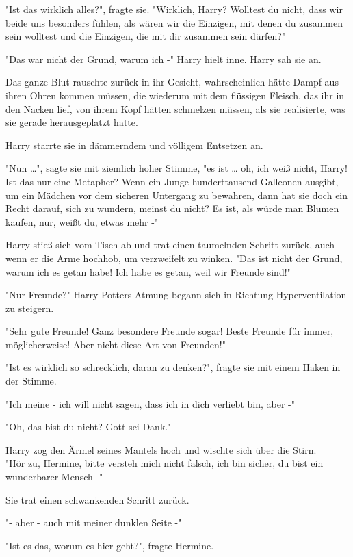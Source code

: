 {"Ist das wirklich alles?", fragte sie. "Wirklich, Harry? Wolltest du nicht, dass wir beide uns besonders fühlen, als wären wir die Einzigen, mit denen du zusammen sein wolltest und die Einzigen, die mit dir zusammen sein dürfen?"

"Das war nicht der Grund, warum ich -" Harry hielt inne. Harry sah sie an.

Das ganze Blut rauschte zurück in ihr Gesicht, wahrscheinlich hätte Dampf aus ihren Ohren kommen müssen, die wiederum mit dem flüssigen Fleisch, das ihr in den Nacken lief, von ihrem Kopf hätten schmelzen müssen, als sie realisierte, was sie gerade herausgeplatzt hatte.

Harry starrte sie in dämmerndem und völligem Entsetzen an.

"Nun …", sagte sie mit ziemlich hoher Stimme, "es ist … oh, ich weiß nicht, Harry! Ist das nur eine Metapher? Wenn ein Junge hunderttausend Galleonen ausgibt, um ein Mädchen vor dem sicheren Untergang zu bewahren, dann hat sie doch ein Recht darauf, sich zu wundern, meinst du nicht? Es ist, als würde man Blumen kaufen, nur, weißt du, etwas mehr -"

Harry stieß sich vom Tisch ab und trat einen taumelnden Schritt zurück, auch wenn er die Arme hochhob, um verzweifelt zu winken. "Das ist nicht der Grund, warum ich es getan habe! Ich habe es getan, weil wir Freunde sind!"

"Nur Freunde?" Harry Potters Atmung begann sich in Richtung Hyperventilation zu steigern.

"Sehr gute Freunde! Ganz besondere Freunde sogar! Beste Freunde für immer, möglicherweise! Aber nicht diese Art von Freunden!"

"Ist es wirklich so schrecklich, daran zu denken?", fragte sie mit einem Haken in der Stimme.

"Ich meine - ich will nicht sagen, dass ich in dich verliebt bin, aber -"

"Oh, das bist du nicht? Gott sei Dank."

Harry zog den Ärmel seines Mantels hoch und wischte sich über die Stirn.\\ "Hör zu, Hermine, bitte versteh mich nicht falsch, ich bin sicher, du bist ein wunderbarer Mensch -"

Sie trat einen schwankenden Schritt zurück.

"- aber - auch mit meiner dunklen Seite -"

"Ist es das, worum es hier geht?", fragte Hermine.

}
